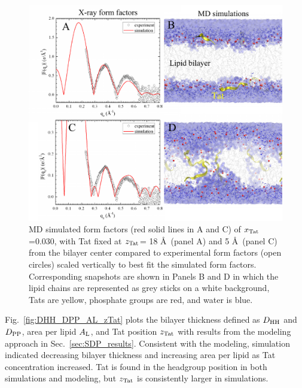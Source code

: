 \begin{figure}[htbp]
  \centering
  \includegraphics[width=\textwidth]{figures/Tat/MD_Results/pore}
  \caption[MD simulated form factors (red solid lines in A and C) of $\xTat$=0.030,
  with Tat fixed at $\zTat$= 18 \AA\ (panel A) and 5 \AA\ (panel C) from the bilayer center compared to
  experimental form factors (open circles) scaled vertically to best fit the
  simulated form factors]
  {MD simulated form factors (red solid lines in A and C) of $\xTat$=0.030,
  with Tat fixed at $\zTat$= 18 \AA\ (panel A) and 5 \AA\ (panel C) from the bilayer center compared to
  experimental form factors (open circles) scaled vertically to best fit the
  simulated form factors. Corresponding snapshots are shown in Panels B and D in which the lipid chains are
  represented as grey sticks on a white background, Tats are yellow, phosphate groups are red, and
  water is blue.}
  \label{fig:figure4}
\end{figure}

Fig.~\ref{fig:DHH_DPP_AL_zTat} plots the bilayer thickness defined as $D_\textrm{HH}$
and $D_\textrm{PP}$, area per lipid $A_\textrm{L}$, and Tat position $\zTat$ with results
from the modeling approach in Sec.~\ref{sec:SDP_results}.
Consistent with the modeling, simulation indicated decreasing bilayer thickness
and increasing area per lipid as Tat concentration increased.
Tat is found in the headgroup position in both simulations 
and modeling, but $\zTat$ is consistently larger in simulations.

